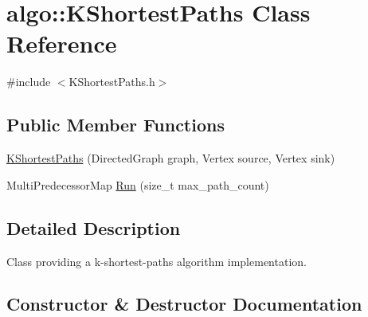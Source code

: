 \hypertarget{classalgo_1_1KShortestPaths}{}\section{algo\+:\+:K\+Shortest\+Paths Class Reference}
\label{classalgo_1_1KShortestPaths}


{\ttfamily \#include $<$K\+Shortest\+Paths.\+h$>$}

\subsection*{Public Member Functions}
\begin{DoxyCompactItemize}
\item 
\hyperlink{classalgo_1_1KShortestPaths_a2805f56b9abb112f10c752d125d623d8}{K\+Shortest\+Paths} (Directed\+Graph graph, Vertex source, Vertex sink)
\item 
Multi\+Predecessor\+Map \hyperlink{classalgo_1_1KShortestPaths_ae77137136462303e951f631ba7db6adf}{Run} (size\+\_\+t max\+\_\+path\+\_\+count)
\end{DoxyCompactItemize}


\subsection{Detailed Description}
Class providing a k-\/shortest-\/paths algorithm implementation. 

\subsection{Constructor \& Destructor Documentation}
